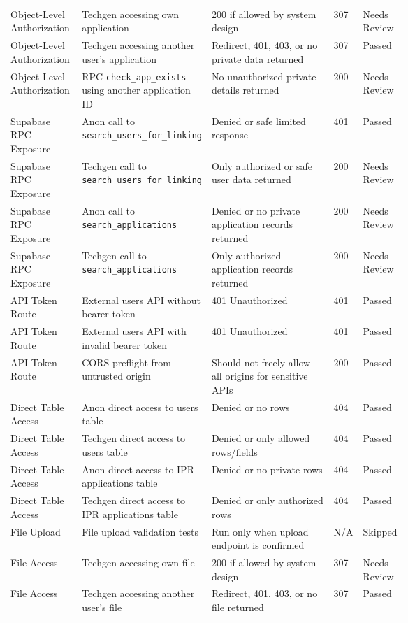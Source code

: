 \begin{landscape}
\begin{xltabular}{\linewidth}{p{0.18\linewidth} p{0.32\linewidth} X p{0.07\linewidth} p{0.09\linewidth}}
Object-Level Authorization & Techgen accessing own application & 200 if allowed by system design & 307 & Needs Review \\
Object-Level Authorization & Techgen accessing another user's application & Redirect, 401, 403, or no private data returned & 307 & Passed \\
Object-Level Authorization & RPC \texttt{check\_app\_exists} using another application ID & No unauthorized private details returned & 200 & Needs Review \\

Supabase RPC Exposure & Anon call to \texttt{search\_users\_for\_linking} & Denied or safe limited response & 401 & Passed \\
Supabase RPC Exposure & Techgen call to \texttt{search\_users\_for\_linking} & Only authorized or safe user data returned & 200 & Needs Review \\
Supabase RPC Exposure & Anon call to \texttt{search\_applications} & Denied or no private application records returned & 200 & Needs Review \\
Supabase RPC Exposure & Techgen call to \texttt{search\_applications} & Only authorized application records returned & 200 & Needs Review \\

API Token Route & External users API without bearer token & 401 Unauthorized & 401 & Passed \\
API Token Route & External users API with invalid bearer token & 401 Unauthorized & 401 & Passed \\
API Token Route & CORS preflight from untrusted origin & Should not freely allow all origins for sensitive APIs & 200 & Passed \\

Direct Table Access & Anon direct access to users table & Denied or no rows & 404 & Passed \\
Direct Table Access & Techgen direct access to users table & Denied or only allowed rows/fields & 404 & Passed \\
Direct Table Access & Anon direct access to IPR applications table & Denied or no private rows & 404 & Passed \\
Direct Table Access & Techgen direct access to IPR applications table & Denied or only authorized rows & 404 & Passed \\

File Upload & File upload validation tests & Run only when upload endpoint is confirmed & N/A & Skipped \\
File Access & Techgen accessing own file & 200 if allowed by system design & 307 & Needs Review \\
File Access & Techgen accessing another user's file & Redirect, 401, 403, or no file returned & 307 & Passed \\


\end{xltabular}
\end{landscape}
